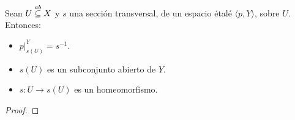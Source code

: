 \begin{Prop}
   Sean $U\stackrel{ab}{\subseteq} X$ y $s$ una sección transversal, de un espacio étalé $\langle p, Y\rangle$, sobre $U$. Entonces:
   \begin{itemize}
      \item $p|^{Y}_{s(U)}=s^{-1}$.
      \item $s(U)$ es un subconjunto abierto de $Y$.
      \item $s:U\to s(U)$ es un homeomorfismo.
   \end{itemize}
\end{Prop}
\begin{proof}
    
\end{proof}
